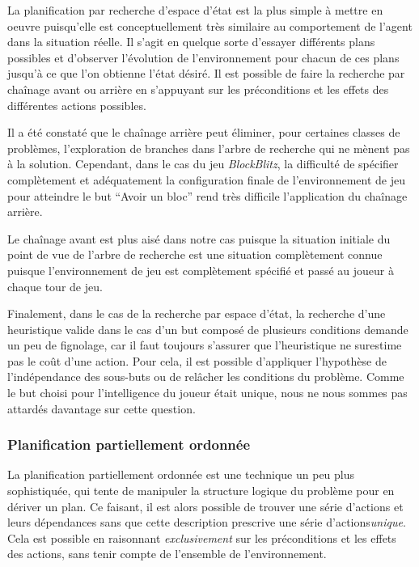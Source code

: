 \documentclass[12pt,english,frenchb,letterpaper]{article}
\begin{document}
La planification par recherche d'espace d'état est la plus simple à mettre en oeuvre puisqu'elle est conceptuellement très similaire au comportement de l'agent dans la situation réelle.  Il s'agit en quelque sorte d'essayer différents plans possibles et d'observer l'évolution de l'environnement pour chacun de ces plans jusqu'à ce que l'on obtienne l'état désiré.  Il est possible de faire la recherche par chaînage avant ou arrière en s'appuyant sur les préconditions et les effets des différentes actions possibles.

Il a été constaté que le chaînage arrière peut éliminer, pour certaines classes de problèmes, l'exploration de branches dans l'arbre de recherche qui ne mènent pas à la solution.  Cependant, dans le cas du jeu \textit{BlockBlitz}, la difficulté de spécifier complètement et adéquatement la configuration finale de l'environnement de jeu pour atteindre le but ``Avoir un bloc'' rend très difficile l'application du chaînage arrière.

Le chaînage avant est plus aisé dans notre cas puisque la situation initiale du point de vue de l'arbre de recherche est une situation complètement connue puisque l'environnement de jeu est complètement spécifié et passé au joueur à chaque tour de jeu.

Finalement, dans le cas de la recherche par espace d'état, la recherche d'une heuristique valide dans le cas d'un but composé de plusieurs conditions demande un peu de fignolage, car il faut toujours s'assurer que l'heuristique ne surestime pas le coût d'une action.  Pour cela, il est possible d'appliquer l'hypothèse de l'indépendance des sous-buts ou de relâcher les conditions du problème.  Comme le but choisi pour l'intelligence du joueur était unique, nous ne nous sommes pas attardés davantage sur cette question.

\subsubsection{Planification partiellement ordonnée}

La planification partiellement ordonnée est une technique un peu plus sophistiquée, qui tente de manipuler la structure logique du problème pour en dériver un plan.  Ce faisant, il est alors possible de trouver une série d'actions et leurs dépendances sans que cette description prescrive une série d'actions\textit{unique}.  Cela est possible en raisonnant \textit{exclusivement} sur les préconditions et les effets des actions, sans tenir compte de l'ensemble de l'environnement.
\end{document}
